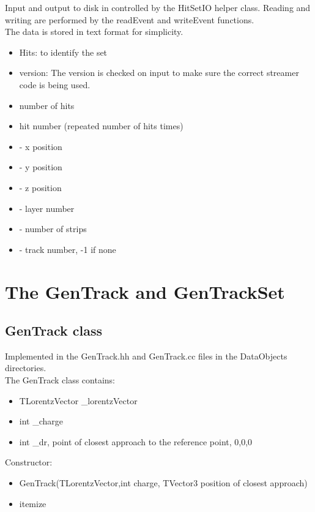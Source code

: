 \documentclass[aps,prd,superscriptaddress,floatfix]{revtex4}
\begin{document}
Input and output to disk in controlled by the HitSetIO helper class.  Reading and writing
are performed by the readEvent and writeEvent functions.
\\

The data is stored in text format for simplicity.

\begin{itemize}
\item  Hits: to identify the set
\item version: The version is checked on input to make sure the correct streamer code is being used.
\item number of hits
\item hit number (repeated number of hits times)
\item - x position
\item - y position
\item - z position
\item - layer number
\item - number of strips
\item - track number, -1 if none 
\end{itemize}

\section{The GenTrack and GenTrackSet}
\subsection{GenTrack class}
Implemented in the GenTrack.hh and GenTrack.cc files in the DataObjects directories.
\\

The GenTrack class contains:
\begin{itemize}
\item TLorentzVector \_lorentzVector
\item int \_charge
\item int \_dr, point of closest approach to the reference point, 0,0,0
\end{itemize}

Constructor:

\begin{itemize}
\item GenTrack(TLorentzVector,int charge, TVector3 position of closest approach)
\item{itemize}
\end{itemize}
\end{document}
